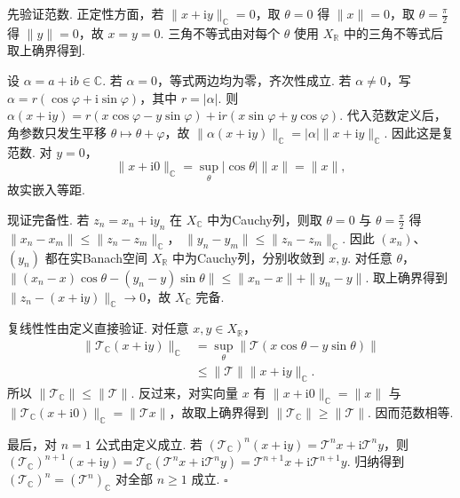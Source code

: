 \begin{FAProof}
先验证范数. 正定性方面，若 \(\displaystyle \|x+\mathrm{i}y\|_{\mathbb C}=0\)，取 \(\displaystyle \theta=0\) 得 \(\displaystyle \|x\|=0\)，取 \(\displaystyle \theta=\frac{\pi}{2}\) 得 \(\displaystyle \|y\|=0\)，故 \(\displaystyle x=y=0\). 三角不等式由对每个 \(\displaystyle \theta\) 使用 \(\displaystyle X_{\mathbb R}\) 中的三角不等式后取上确界得到.

设 \(\displaystyle \alpha=a+\mathrm{i}b\in\mathbb C\). 若 \(\displaystyle \alpha=0\)，等式两边均为零，齐次性成立. 若 \(\displaystyle \alpha\neq0\)，写 \(\displaystyle \alpha=r(\cos\varphi+\mathrm{i}\sin\varphi)\)，其中 \(\displaystyle r=|\alpha|\). 则
\(\displaystyle \alpha(x+\mathrm{i}y) = r(x\cos\varphi-y\sin\varphi) + \mathrm{i}r(x\sin\varphi+y\cos\varphi)\).
代入范数定义后，角参数只发生平移 \(\displaystyle \theta\mapsto\theta+\varphi\)，故
\(\displaystyle \|\alpha(x+\mathrm{i}y)\|_{\mathbb C} = |\alpha|\|x+\mathrm{i}y\|_{\mathbb C}\).
因此这是复范数. 对 \(\displaystyle y=0\)，
\[
\|x+\mathrm{i}0\|_{\mathbb C}
=
\sup_{\theta}|\cos\theta|\|x\|
=
\|x\|,
\]
故实嵌入等距.

现证完备性. 若 \(\displaystyle z_n=x_n+\mathrm{i}y_n\) 在 \(\displaystyle X_{\mathbb C}\) 中为Cauchy列，则取 \(\displaystyle \theta=0\) 与 \(\displaystyle \theta=\frac{\pi}{2}\) 得
\(\displaystyle \|x_n-x_m\| \leqslant \|z_n-z_m\|_{\mathbb C}\)，
\(\displaystyle \|y_n-y_m\| \leqslant \|z_n-z_m\|_{\mathbb C}\).
因此 \(\displaystyle (x_n)\)、\(\displaystyle (y_n)\) 都在实Banach空间 \(\displaystyle X_{\mathbb R}\) 中为Cauchy列，分别收敛到 \(\displaystyle x,y\). 对任意 \(\displaystyle \theta\)，
\(\displaystyle \|(x_n-x)\cos\theta-(y_n-y)\sin\theta\| \leqslant \|x_n-x\|+\|y_n-y\|\).
取上确界得到 \(\displaystyle \|z_n-(x+\mathrm{i}y)\|_{\mathbb C}\to0\)，故 \(\displaystyle X_{\mathbb C}\) 完备.

复线性性由定义直接验证. 对任意 \(\displaystyle x,y\in X_{\mathbb R}\)，
\[
\begin{aligned}
\displaystyle \|\mathcal T_{\mathbb C}(x+\mathrm{i}y)\|_{\mathbb C}
&\displaystyle =
\sup_{\theta}
\|\mathcal T(x\cos\theta-y\sin\theta)\|\\
&\displaystyle \leqslant
\|\mathcal T\|
\|x+\mathrm{i}y\|_{\mathbb C}.
\end{aligned}
\]
所以 \(\displaystyle \|\mathcal T_{\mathbb C}\|\leqslant\|\mathcal T\|\). 反过来，对实向量 \(\displaystyle x\) 有 \(\displaystyle \|x+\mathrm{i}0\|_{\mathbb C}=\|x\|\) 与 \(\displaystyle \|\mathcal T_{\mathbb C}(x+\mathrm{i}0)\|_{\mathbb C}=\|\mathcal T x\|\)，故取上确界得到 \(\displaystyle \|\mathcal T_{\mathbb C}\|\geqslant\|\mathcal T\|\). 因而范数相等.

最后，对 \(\displaystyle n=1\) 公式由定义成立. 若 \(\displaystyle (\mathcal T_{\mathbb C})^n(x+\mathrm{i}y)=\mathcal T^n x+\mathrm{i}\mathcal T^n y\)，则 \(\displaystyle (\mathcal T_{\mathbb C})^{n+1}(x+\mathrm{i}y)=\mathcal T_{\mathbb C}(\mathcal T^n x+\mathrm{i}\mathcal T^n y)=\mathcal T^{n+1}x+\mathrm{i}\mathcal T^{n+1}y\). 归纳得到 \(\displaystyle (\mathcal T_{\mathbb C})^n=(\mathcal T^n)_{\mathbb C}\) 对全部 \(\displaystyle n\geqslant1\) 成立.
\hfill\(\square\)
\end{FAProof}

